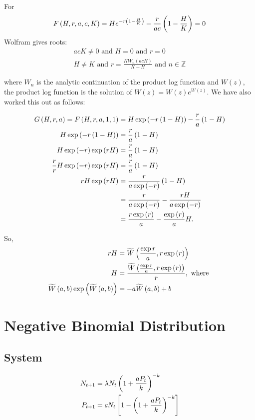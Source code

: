 \documentclass{article}
\begin{document}
For
\begin{align*}
F\left(H, r, a, c, K\right) = H e^{-r\left(1-\frac{H}{K}\right)} - \frac{r}{ac} \left(1-\frac{H}{K}\right) = 0
\end{align*}
Wolfram gives roots:
\begin{align*}
    acK \ne 0 \text{ and } H=0 \text{ and } r=0\\
    H \ne K \text{ and } r = \frac{KW_n(acH)}{K-H} \text{ and } n \in \mathbb{Z}
\end{align*}

where $W_n$ is the analytic continuation of the product log function and $W(z)$, the product log function is the solution of $W(z) = W(z) e^{W(z)}$. We have also worked this out as follows:

\begin{align*}
    G\left(H, r, a\right) = F\left(H, r, a, 1, 1\right) &= H \exp{\left(-r\left(1 - H\right)\right)} - \frac{r}{a}\left(1-H\right)\\
    H\exp{\left(-r\left(1-H\right)\right)}                    &= \frac{r}{a} \left(1-H\right)\\
    H\exp{\left(-r\right)}\exp{\left(rH\right)}               &= \frac{r}{a}\left(1-H\right)\\
    \frac{r}{r} H \exp{\left(-r\right)} \exp{\left(rH\right)} &= \frac{r}{a}\left(1-H\right)\\
    rH\exp{\left(rH\right)} &= \frac{r}{a\exp{\left(-r\right)}} \left(1-H\right)\\
                    &= \frac{r}{a\exp{\left(-r\right)}} - \frac{rH}{a\exp{\left(-r\right)}}\\
                    &= \frac{r\exp{\left(r\right)}}{a} - \frac{\exp{\left(r\right)}}{a} H.
\end{align*}

So,
\begin{align*}
    rH &= \widetilde{W}\left(\frac{\exp{r}}{a}, r \exp{\left(r\right)}\right)\\
    H &= \frac{\widetilde{W}\left(\frac{\exp{r}}{a}, r \exp{\left(r\right)}\right)}{r}, \text{ where }\\
    \widetilde{W}\left(a,b\right)\exp{\left(\widetilde{W}\left(a,b\right)\right)} &= -a \widetilde{W}\left(a,b\right) + b
\end{align*}


\pagebreak
\section{Negative Binomial Distribution}
\subsection{System}
\begin{align*}
    N_{t+1} &= \lambda N_t \left(1+\frac{aP_t}{k}\right)^{-k}\\
    P_{t+1} &= c N_t \left[1-\left(1+\frac{aP_t}{k}\right)^{-k}\right]
\end{align*}
\end{document}
